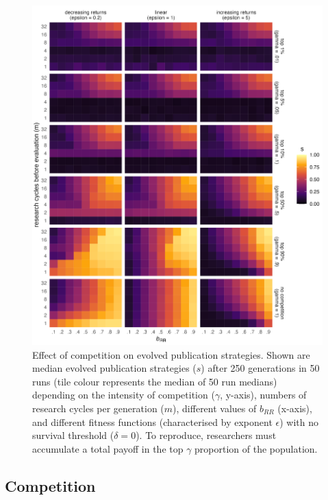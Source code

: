 \documentclass[
  ,man,mask,floatsintext]{apa6}
\begin{document}
\begin{figure}
\includegraphics[width=1\linewidth]{plots/plot_gamma_evo_epsilon_inferno} \caption{Effect of competition on evolved publication strategies. Shown are median evolved publication strategies (\(s\)) after 250 generations in 50 runs (tile colour represents the median of 50 run medians) depending on the intensity of competition (\(\gamma\), y-axis), numbers of research cycles per generation (\(m\)), different values of \(b_{RR}\) (x-axis), and different fitness functions (characterised by exponent \(\epsilon\)) with no survival threshold (\(\delta = 0\)). To reproduce, researchers must accumulate a total payoff in the top \(\gamma\) proportion of the population.}\label{fig:competitionplot}
\end{figure}

\hypertarget{competition}{%
\subsection{Competition}\label{competition}}
\end{document}
